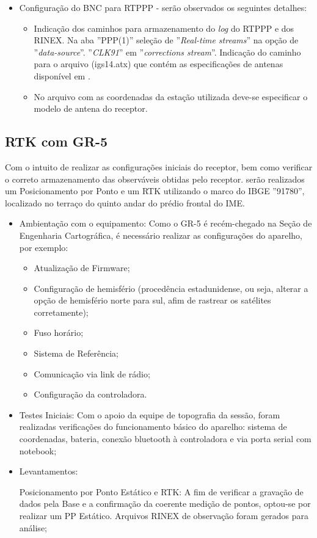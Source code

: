 \begin{itemize}
\begin{itemize}
    \end{itemize}
    \item Configuração do BNC para RTPPP - serão observados os seguintes detalhes:
    \begin{itemize}
        \item Indicação dos caminhos para armazenamento do \textit{log} do RTPPP e dos RINEX. Na aba ''PPP(1)'' seleção de ''\textit{Real-time streams}'' na opção de ''\textit{data-source}''. ''\textit{CLK91}'' em ''\textit{corrections stream}''. Indicação do caminho para o arquivo (igs14.atx) que contém as especificações de antenas disponível em \cite{ngsatx}.
        \item No arquivo com as coordenadas da estação utilizada deve-se especificar o modelo de antena do receptor.
    \end{itemize}
\end{itemize}

\subsection{RTK com GR-5}


Com o intuito de realizar as configurações iniciais do receptor, bem como verificar o correto armazenamento das observáveis obtidas pelo receptor. serão realizados um Posicionamento por Ponto e um RTK utilizando o marco do IBGE ''91780'', localizado no terraço do quinto andar do prédio frontal do IME.

\begin{itemize}
    \item Ambientação com o equipamento: Como o GR-5 é recém-chegado na Seção de Engenharia Cartográfica, é necessário realizar as configurações do aparelho, por exemplo: 
    \begin{itemize}
        \item Atualização de Firmware;
        \item Configuração de hemisfério (procedência estadunidense, ou seja, alterar a opção de hemisfério norte para sul, afim de rastrear os satélites corretamente);
        \item Fuso horário;
        \item Sistema de Referência;
        \item Comunicação via link de rádio;
        \item Configuração da controladora.
    \end{itemize}
    \item Testes Iniciais: Com o apoio da equipe de topografia da sessão, foram realizadas verificações do funcionamento básico do aparelho: sistema de coordenadas, bateria, conexão bluetooth à controladora e via porta serial com notebook;
    
    \item Levantamentos:
    
    Posicionamento por Ponto Estático e RTK: A fim de verificar a gravação de dados pela Base e a confirmação da coerente medição de pontos, optou-se por realizar um PP Estático. Arquivos RINEX de observação foram gerados para análise;

    
\end{itemize}


